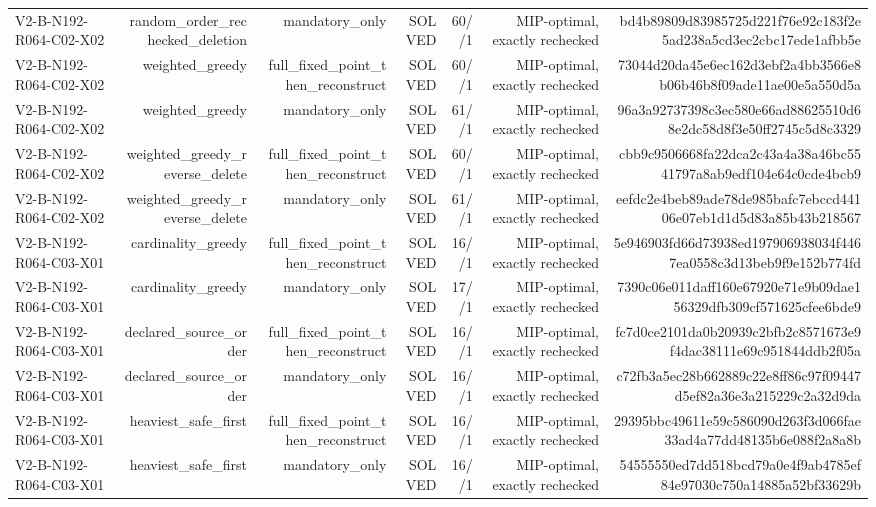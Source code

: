 {\begin{longtable}{lrrrrrr}
V2-B-N192-R064-C02-X02 & random\_order\_rechecked\_deletion & mandatory\_only & SOLVED & 60//1 & MIP-optimal, exactly rechecked & bd4b89809d83985725d221f76e92c183f2e5ad238a5cd3ec2cbc17ede1afbb5e \\
V2-B-N192-R064-C02-X02 & weighted\_greedy & full\_fixed\_point\_then\_reconstruct & SOLVED & 60//1 & MIP-optimal, exactly rechecked & 73044d20da45e6ec162d3ebf2a4bb3566e8b06b46b8f09ade11ae00e5a550d5a \\
V2-B-N192-R064-C02-X02 & weighted\_greedy & mandatory\_only & SOLVED & 61//1 & MIP-optimal, exactly rechecked & 96a3a92737398c3ec580e66ad88625510d68e2dc58d8f3e50ff2745c5d8c3329 \\
V2-B-N192-R064-C02-X02 & weighted\_greedy\_reverse\_delete & full\_fixed\_point\_then\_reconstruct & SOLVED & 60//1 & MIP-optimal, exactly rechecked & cbb9c9506668fa22dca2c43a4a38a46bc5541797a8ab9edf104e64c0cde4bcb9 \\
V2-B-N192-R064-C02-X02 & weighted\_greedy\_reverse\_delete & mandatory\_only & SOLVED & 61//1 & MIP-optimal, exactly rechecked & eefdc2e4beb89ade78de985bafc7ebccd44106e07eb1d1d5d83a85b43b218567 \\
V2-B-N192-R064-C03-X01 & cardinality\_greedy & full\_fixed\_point\_then\_reconstruct & SOLVED & 16//1 & MIP-optimal, exactly rechecked & 5e946903fd66d73938ed197906938034f4467ea0558c3d13beb9f9e152b774fd \\
V2-B-N192-R064-C03-X01 & cardinality\_greedy & mandatory\_only & SOLVED & 17//1 & MIP-optimal, exactly rechecked & 7390c06e011daff160e67920e71e9b09dae156329dfb309cf571625cfee6bde9 \\
V2-B-N192-R064-C03-X01 & declared\_source\_order & full\_fixed\_point\_then\_reconstruct & SOLVED & 16//1 & MIP-optimal, exactly rechecked & fc7d0ce2101da0b20939c2bfb2c8571673e9f4dac38111e69c951844ddb2f05a \\
V2-B-N192-R064-C03-X01 & declared\_source\_order & mandatory\_only & SOLVED & 16//1 & MIP-optimal, exactly rechecked & c72fb3a5ec28b662889c22e8ff86c97f09447d5ef82a36e3a215229c2a32d9da \\
V2-B-N192-R064-C03-X01 & heaviest\_safe\_first & full\_fixed\_point\_then\_reconstruct & SOLVED & 16//1 & MIP-optimal, exactly rechecked & 29395bbc49611e59c586090d263f3d066fae33ad4a77dd48135b6e088f2a8a8b \\
V2-B-N192-R064-C03-X01 & heaviest\_safe\_first & mandatory\_only & SOLVED & 16//1 & MIP-optimal, exactly rechecked & 54555550ed7dd518bcd79a0e4f9ab4785ef84e97030c750a14885a52bf33629b \\

\end{longtable}}
